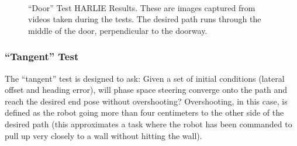 \begin{figure}
\centering
{}
\hfill
{}
\\
\caption[``Door'' Test HARLIE Results]{``Door'' Test HARLIE Results. These are images captured from videos taken during the tests. The desired path runs through the middle of the door, perpendicular to the doorway.}
\label{fig:door_skill_harlie_results}
\end{figure}

\subsubsection{``Tangent'' Test}\label{subsubsec:tangent_test}

The ``tangent'' test is designed to ask: Given a set of initial conditions (lateral offset and heading error), will phase space steering converge onto the path and reach the desired end pose without overshooting? Overshooting, in this case, is defined as the robot going more than four centimeters to the other side of the desired path (this approximates a task where the robot has been commanded to pull up very closely to a wall without hitting the wall).

